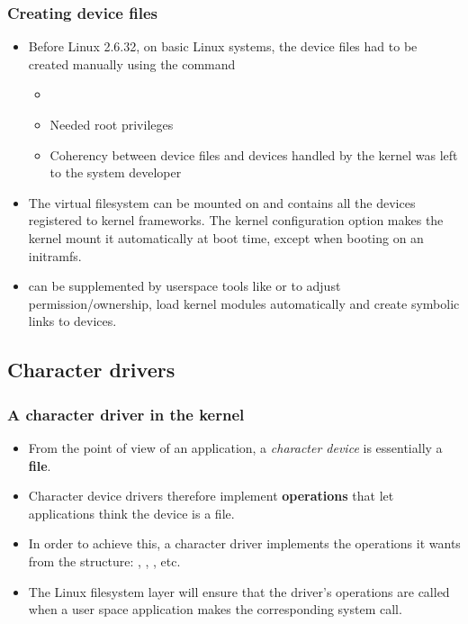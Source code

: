 \begin{frame}
  \frametitle{Creating device files}
  \begin{itemize}
    \item Before Linux 2.6.32, on basic Linux systems,
    the device files had to be created manually using the
     command
    \begin{itemize}
    \item {}
    \item Needed root privileges
    \item Coherency between device files and devices handled by the
      kernel was left to the system developer
    \end{itemize}
  \item The  virtual filesystem can be mounted on
     and contains all the devices registered to kernel frameworks.
    The  kernel configuration option
    makes the kernel mount it automatically at boot time, except
    when booting on an initramfs.
  \item {} can be supplemented by userspace tools like
     or  to adjust permission/ownership, load
    kernel modules automatically and create symbolic links to devices.
  \end{itemize}
\end{frame}

\subsection{Character drivers}

\begin{frame}
  \frametitle{A character driver in the kernel}
  \begin{itemize}
  \item From the point of view of an application, a {\em character
      device} is essentially a {\bf file}.
  \item Character device drivers therefore implement {\bf operations}
    that let applications think the device is a file.
  \item In order to achieve this, a character driver implements
    the operations it wants from the 
    structure: , , , etc.
  \item The Linux filesystem layer will ensure that the driver's
    operations are called when a user space application makes the
    corresponding system call.
  \end{itemize}
\end{frame}

